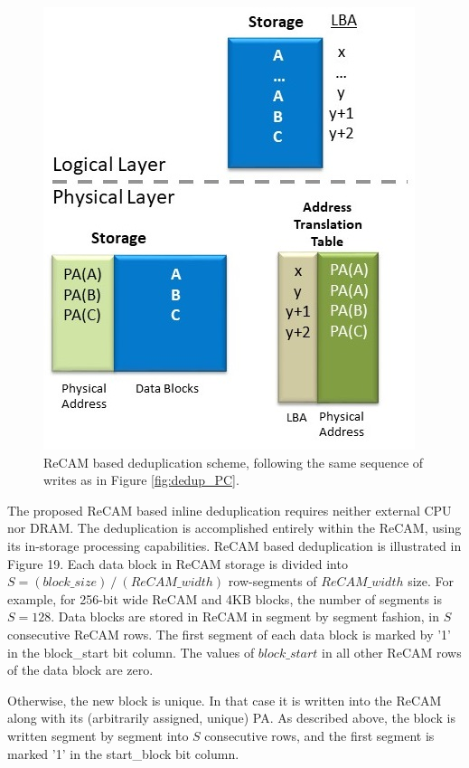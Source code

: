 \documentclass{superfri}
\begin{document}
\begin{figure}[ht!]
	\centerline{\includegraphics[scale=0.6]{Figures/dedup_ReCAM.jpg}}
	\caption{ReCAM based deduplication scheme, following the same sequence of writes as in Figure \ref{fig:dedup_PC}.}
	\label{fig:dedup_ReCAM}
\end{figure}

The proposed ReCAM based inline deduplication requires neither external CPU nor DRAM. The deduplication is accomplished entirely within the ReCAM, using its in-storage processing capabilities. ReCAM based deduplication is illustrated in Figure 19. Each data block in ReCAM storage is divided into $S=(block\_size)⁄(ReCAM\_width)$ row-segments of $ReCAM\_width$ size. For example, for 256-bit wide ReCAM and 4KB blocks, the number of segments is $S=128$. Data blocks are stored in ReCAM in segment by segment fashion, in $S$ consecutive ReCAM rows. The first segment of each data block is marked by '1' in the block\_start bit column. The values of $block\_start$ in all other ReCAM rows of the data block are zero. 

Otherwise, the new block is unique. In that case it is written into the ReCAM along with its (arbitrarily assigned, unique) PA. As described above, the block is written segment by segment into $S$ consecutive rows, and the first segment is marked '1' in the start\_block bit column. 
\end{document}
